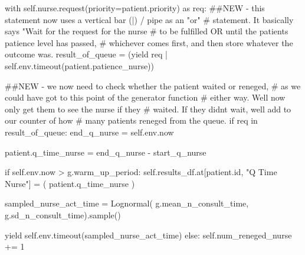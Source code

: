 \documentclass[
  letterpaper,
  DIV=11,
  numbers=noendperiod]{scrreprt}
\newenvironment{Shaded}{}{}
\newcommand{\BuiltInTok}[1]{\textcolor[rgb]{0.84,0.23,0.29}{#1}}
\newcommand{\CommentTok}[1]{\textcolor[rgb]{0.42,0.45,0.49}{#1}}
\newcommand{\ControlFlowTok}[1]{\textcolor[rgb]{0.84,0.23,0.29}{#1}}
\newcommand{\DecValTok}[1]{\textcolor[rgb]{0.00,0.36,0.77}{#1}}
\newcommand{\ImportTok}[1]{\textcolor[rgb]{0.01,0.18,0.38}{#1}}
\newcommand{\KeywordTok}[1]{\textcolor[rgb]{0.84,0.23,0.29}{#1}}
\newcommand{\NormalTok}[1]{\textcolor[rgb]{0.14,0.16,0.18}{#1}}
\newcommand{\OperatorTok}[1]{\textcolor[rgb]{0.14,0.16,0.18}{#1}}
\newcommand{\StringTok}[1]{\textcolor[rgb]{0.01,0.18,0.38}{#1}}
\newcommand{\VariableTok}[1]{\textcolor[rgb]{0.89,0.38,0.04}{#1}}
\begin{document}
\begin{tcolorbox}
\begin{Shaded}
\begin{Highlighting}[]
        \ControlFlowTok{with} \VariableTok{self}\NormalTok{.nurse.request(priority}\OperatorTok{=}\NormalTok{patient.priority) }\ImportTok{as}\NormalTok{ req:}
            \CommentTok{\#\#NEW {-} this statement now uses a vertical bar (|) / pipe as an "or"}
            \CommentTok{\# statement.  It basically says "Wait for the request for the nurse}
            \CommentTok{\# to be fulfilled OR until the patient\textquotesingle{}s patience level has passed,}
            \CommentTok{\# whichever comes first, and then store whatever the outcome was.}
\NormalTok{            result\_of\_queue }\OperatorTok{=}\NormalTok{ (}\ControlFlowTok{yield}\NormalTok{ req }\OperatorTok{|}
                               \VariableTok{self}\NormalTok{.env.timeout(patient.patience\_nurse))}

            \CommentTok{\#\#NEW {-} we now need to check whether the patient waited or reneged,}
            \CommentTok{\# as we could have got to this point of the generator function}
            \CommentTok{\# either way.  We\textquotesingle{}ll now only get them to see the nurse if they}
            \CommentTok{\# waited.  If they didn\textquotesingle{}t wait, we\textquotesingle{}ll add to our counter of how}
            \CommentTok{\# many patients reneged from the queue.}
            \ControlFlowTok{if}\NormalTok{ req }\KeywordTok{in}\NormalTok{ result\_of\_queue:}
\NormalTok{                end\_q\_nurse }\OperatorTok{=} \VariableTok{self}\NormalTok{.env.now}

\NormalTok{                patient.q\_time\_nurse }\OperatorTok{=}\NormalTok{ end\_q\_nurse }\OperatorTok{{-}}\NormalTok{ start\_q\_nurse}

                \ControlFlowTok{if} \VariableTok{self}\NormalTok{.env.now }\OperatorTok{\textgreater{}}\NormalTok{ g.warm\_up\_period:}
                    \VariableTok{self}\NormalTok{.results\_df.at[patient.}\BuiltInTok{id}\NormalTok{, }\StringTok{"Q Time Nurse"}\NormalTok{] }\OperatorTok{=}\NormalTok{ (}
\NormalTok{                        patient.q\_time\_nurse}
\NormalTok{                    )}

\NormalTok{                sampled\_nurse\_act\_time }\OperatorTok{=}\NormalTok{ Lognormal(}
\NormalTok{                    g.mean\_n\_consult\_time, g.sd\_n\_consult\_time).sample()}

                \ControlFlowTok{yield} \VariableTok{self}\NormalTok{.env.timeout(sampled\_nurse\_act\_time)}
            \ControlFlowTok{else}\NormalTok{:}
                \VariableTok{self}\NormalTok{.num\_reneged\_nurse }\OperatorTok{+=} \DecValTok{1}


\end{Highlighting}
\end{Shaded}
\end{tcolorbox}
\end{document}
